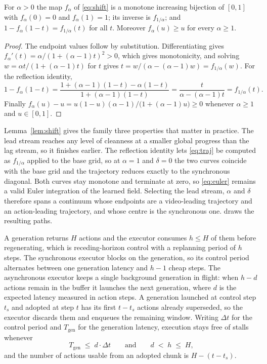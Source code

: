 \begin{lemma}
\label{lem:shift}
For $\alpha > 0$ the map $f_\alpha$ of \eqref{eq:shift} is a monotone increasing
bijection of $[0,1]$ with $f_\alpha(0) = 0$ and $f_\alpha(1) = 1$; its inverse is
$f_{1/\alpha}$; and $1 - f_\alpha(1 - t) = f_{1/\alpha}(t)$ for all $t$.
Moreover $f_\alpha(u) \geq u$ for every $\alpha \geq 1$.
\end{lemma}

\begin{proof}
The endpoint values follow by substitution. Differentiating gives
$f_\alpha'(t) = \alpha / (1 + (\alpha-1)t)^2 > 0$, which gives monotonicity, and
solving $w = \alpha t / (1 + (\alpha - 1)t)$ for $t$ gives
$t = w / (\alpha - (\alpha - 1) w) = f_{1/\alpha}(w)$. For the reflection
identity,
\[
  1 - f_\alpha(1-t)
  = \frac{1 + (\alpha-1)(1-t) - \alpha(1-t)}{1 + (\alpha-1)(1-t)}
  = \frac{t}{\alpha - (\alpha-1)t}
  = f_{1/\alpha}(t).
\]
Finally
$f_\alpha(u) - u = u(1-u)(\alpha-1) / \big(1 + (\alpha-1)u\big) \geq 0$
whenever $\alpha \geq 1$ and $u \in [0,1]$.
\end{proof}

Lemma~\ref{lem:shift} gives the family three properties that matter in practice. The
lead stream reaches any level of cleanness at a smaller global progress than the
lag stream, so it finishes earlier. The reflection identity lets
\eqref{eq:traj} be computed as $f_{1/\alpha}$ applied to the base grid, so at
$\alpha = 1$ and $\delta = 0$ the two curves coincide with the base grid and the
trajectory reduces exactly to the synchronous diagonal. Both curves stay
monotone and terminate at zero, so \eqref{eq:euler} remains a valid Euler
integration of the learned field. Selecting the lead stream, $\alpha$ and
$\delta$ therefore spans a continuum whose endpoints are a video-leading
trajectory and an action-leading trajectory, and whose centre is the synchronous
one.  draws the resulting paths.

A generation returns $H$ actions and the executor consumes $h \leq H$ of them
before regenerating, which is receding-horizon control with a replanning period
of $h$ steps. The synchronous executor blocks on the generation, so its control
period alternates between one generation latency and $h-1$ cheap steps. The
asynchronous executor keeps a single background generation in flight: when
$h - d$ actions remain in the buffer it launches the next generation, where $d$
is the expected latency measured in action steps. A generation launched at
control step $t_s$ and adopted at step $t$ has its first $t - t_s$ actions
already superseded, so the executor discards them and enqueues the remaining
window. Writing $\Delta t$ for the control period and $T_{\text{gen}}$ for the
generation latency, execution stays free of stalls whenever
\begin{equation}
  T_{\text{gen}} \;\leq\; d \cdot \Delta t
  \qquad\text{and}\qquad
  d \;<\; h \;\leq\; H,
  \label{eq:async}
\end{equation}
and the number of actions usable from an adopted chunk is $H - (t - t_s)$.

